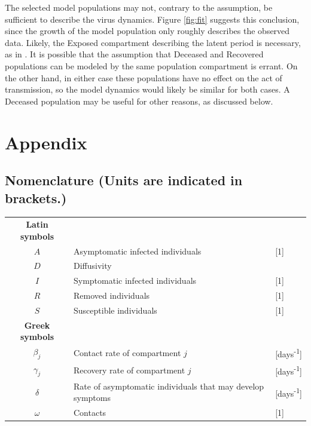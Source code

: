 \documentclass[11pt]{article}
\begin{document}
	The selected model populations may not, contrary to the assumption, be sufficient to describe the virus dynamics.
	Figure \ref{fig:fit} suggests this conclusion, since the growth of the model population only roughly describes the observed data.
	Likely, the Exposed compartment describing the latent period is necessary, as in \cite{Mammeri+2020+102+113}.
	It is possible that the assumption that Deceased and Recovered populations can be modeled by the same population compartment is errant.
	On the other hand, in either case these populations have no effect on the act of transmission, so the model dynamics would likely be similar for both cases.
	A Deceased population may be useful for other reasons, as discussed below.
	
	

\section*{Appendix}
	\subsection*{Nomenclature (Units are indicated in brackets.)}
		\begin{longtable}{c l l}
			\textbf{Latin symbols} & & \\
			$A$ & Asymptomatic infected individuals & [1] \\
			$D$ & Diffusivity & \\
			$I$ & Symptomatic infected individuals & [1] \\
			$R$ & Removed individuals & [1] \\
			$S$ & Susceptible individuals & [1] \\
			\textbf{Greek symbols} & & \\
			$\beta_j$ & Contact rate of compartment $j$ & [days\textsuperscript{-1}] \\
			$\gamma_j$ & Recovery rate of compartment $j$ & [days\textsuperscript{-1}] \\
			$\delta$ & Rate of asymptomatic individuals that may develop symptoms & [days\textsuperscript{-1}] \\
			$\omega$ & Contacts & [1]
		\end{longtable}
	
	\newpage
\end{document}
